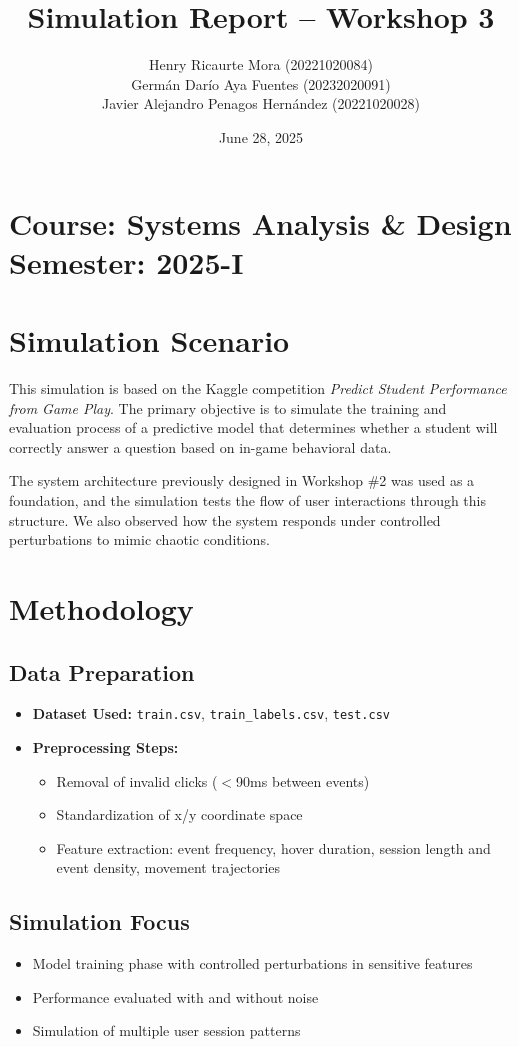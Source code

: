 \documentclass[12pt]{article}
\title{Simulation Report – Workshop 3}
\author{
	Henry Ricaurte Mora (20221020084)\\
	Germán Darío Aya Fuentes (20232020091)\\
	Javier Alejandro Penagos Hernández (20221020028)
}
\date{June 28, 2025}
\begin{document}
	
	\maketitle
	
	\section*{Course: Systems Analysis \& Design \hfill Semester: 2025-I}
	
	\section{Simulation Scenario}
	This simulation is based on the Kaggle competition \textit{Predict Student Performance from Game Play}. The primary objective is to simulate the training and evaluation process of a predictive model that determines whether a student will correctly answer a question based on in-game behavioral data.
	
	The system architecture previously designed in Workshop \#2 was used as a foundation, and the simulation tests the flow of user interactions through this structure. We also observed how the system responds under controlled perturbations to mimic chaotic conditions.
	
	\section{Methodology}
	
	\subsection{Data Preparation}
	\begin{itemize}
		\item \textbf{Dataset Used:} \texttt{train.csv}, \texttt{train\_labels.csv}, \texttt{test.csv}
		\item \textbf{Preprocessing Steps:}
		\begin{itemize}
			\item Removal of invalid clicks ($<$90ms between events)
			\item Standardization of x/y coordinate space
			\item Feature extraction: event frequency, hover duration, session length and event density, movement trajectories
		\end{itemize}
	\end{itemize}
	
	\subsection{Simulation Focus}
	\begin{itemize}
		\item Model training phase with controlled perturbations in sensitive features
		\item Performance evaluated with and without noise
		\item Simulation of multiple user session patterns
	\end{itemize}
	
\end{document}
